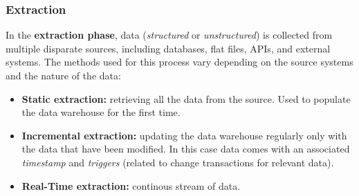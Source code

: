\subsubsection{Extraction}
In the \textbf{extraction phase}, data (\textit{structured} or \textit{unstructured}) is collected from multiple disparate sources, including databases, flat files, APIs, and external systems. The methods used for this process vary depending on the source systems and the nature of the data:
\begin{itemize}
    \item \textbf{Static extraction:} retrieving all the data from the source. Used to populate the data warehouse for the first time.
    \item \textbf{Incremental extraction:} updating the data warehouse regularly only with the data that have been modified. In this case data comes with an associated \textit{timestamp} and \textit{triggers} (related to change transactions for relevant data).
    \item \textbf{Real-Time extraction:} continous stream of data.
\end{itemize}

